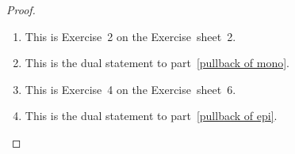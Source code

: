 \begin{proof}
  \leavevmode
  \begin{enumerate}
    \item
      This is Exercise~2 on the Exercise~sheet~2.
    \item
      This is the dual statement to part~\ref*{pullback of mono}.
    \item
      This is Exercise~4 on the Exercise~sheet~6.
    \item
      This is the dual statement to part~\ref*{pullback of epi}.
    \qedhere
  \end{enumerate}
\end{proof}

